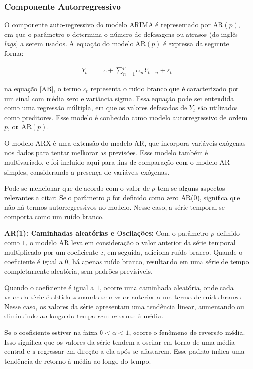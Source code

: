 \subsubsection{Componente Autorregressivo}

O componente auto-regressivo do modelo ARIMA é representado por AR$(p)$, em que o parâmetro $p$ determina o número de defesagens ou atrasos (do inglês \textit{lags}) a serem usados.
A equação do modelo AR$(p)$ é expressa da seguinte forma:

\begin{eqnarray}
	Y_t&=&c+\sum_{n=1}^{p} \alpha_n Y_{t-n} + \varepsilon_t\label{AR}
\end{eqnarray}


\noindent na equação \eqref{AR}, o termo $\varepsilon_t$ representa o ruído branco que é caracterizado por um sinal com média zero e variância sigma. Essa equação pode ser entendida como uma regressão múltipla, em que os valores defasados de $Y_t$ são utilizados como preditores. Esse modelo é conhecido como modelo autorregressivo de ordem $p$, ou AR$(p)$.


O modelo ARX é uma extensão do modelo AR, que incorpora variáveis exógenas nos dados para tentar melhorar as previsões. Esse modelo também é multivariado, e foi incluído aqui para fins de comparação com o modelo AR simples, considerando a presença de variáveis exógenas.


Pode-se mencionar que de acordo com o valor de $p$ tem-se alguns aspectos relevantes a citar:
Se o parâmetro $p$ for definido como zero AR($0$), significa que não há termos autorregressivos no modelo. Nesse caso, a série temporal se comporta como um ruído branco. 



\textbf{AR(1): Caminhadas aleat\'orias e Oscila\c c\~oes: }
Com o parâmetro $p$ definido como $1$, o modelo AR leva em consideração o valor anterior da série temporal multiplicado por um coeficiente e, em seguida, adiciona ruído branco. Quando o coeficiente é igual a $0$, há apenas ruído branco, resultando em uma série de tempo completamente aleatória, sem padrões previsíveis.

Quando o coeficiente é igual a $1$, ocorre uma caminhada aleatória, onde cada valor da série é obtido somando-se o valor anterior a um termo de ruído branco. Nesse caso, os valores da série apresentam uma tendência linear, aumentando ou diminuindo ao longo do tempo sem retornar à média.

Se o coeficiente estiver na faixa $0 < \alpha < 1$, ocorre o fenômeno de reversão média. Isso significa que os valores da série tendem a oscilar em torno de uma média central e a regressar em direção a ela após se afastarem. Esse padrão indica uma tendência de retorno à média ao longo do tempo.


